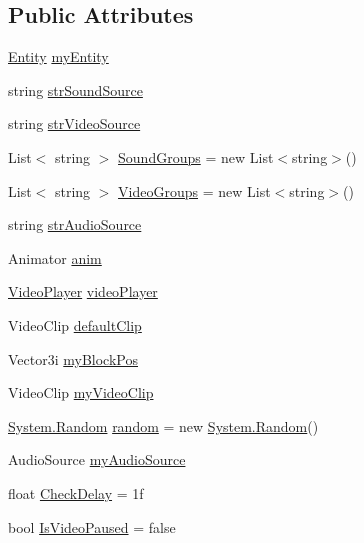 \subsection*{Public Attributes}
\begin{DoxyCompactItemize}
\item 
\mbox{\hyperlink{_the_01_restless_01_curse_2_config_2_localization_8txt_a831452d5736d8c492ddd792b09c12cde}{Entity}} \mbox{\hyperlink{class_music_box_script_a7ba5862fb7e7962d530b67a0ad8ec296}{my\+Entity}}
\item 
string \mbox{\hyperlink{class_music_box_script_a8c18df09c9b7073b85e945eef5819626}{str\+Sound\+Source}}
\item 
string \mbox{\hyperlink{class_music_box_script_ae437345fa8a68f90e00a958f5166ef7b}{str\+Video\+Source}}
\item 
List$<$ string $>$ \mbox{\hyperlink{class_music_box_script_ad24ee7923c7a633fc881d2f11e8f227d}{Sound\+Groups}} = new List$<$string$>$()
\item 
List$<$ string $>$ \mbox{\hyperlink{class_music_box_script_abe3dd8203dd5dc88f5abfac945c7853f}{Video\+Groups}} = new List$<$string$>$()
\item 
string \mbox{\hyperlink{class_music_box_script_a6afd9315a8e79ab480f26a101811ce29}{str\+Audio\+Source}}
\item 
Animator \mbox{\hyperlink{class_music_box_script_a466b8f3f5b4e00af10a0b5c0b3a346e7}{anim}}
\item 
\mbox{\hyperlink{_sphere_i_i_01_music_01_boxes_2_config_2_localization_8txt_a56e37348dc5b6d24d95c96cebefe15af}{Video\+Player}} \mbox{\hyperlink{class_music_box_script_a1b67f8837e4d93c47a7e07f1870b4a18}{video\+Player}}
\item 
Video\+Clip \mbox{\hyperlink{class_music_box_script_ad2c55059bedf46cb2c448f7cd6663e02}{default\+Clip}}
\item 
Vector3i \mbox{\hyperlink{class_music_box_script_aa76607105797e5a84ab1c108b1a42737}{my\+Block\+Pos}}
\item 
Video\+Clip \mbox{\hyperlink{class_music_box_script_a61172a8ddeb5c7751108c81f9af5cd7d}{my\+Video\+Clip}}
\item 
\mbox{\hyperlink{_winter_mod_prefab_8cs_a24953b19d956caa76c403684c71b4e5b}{System.\+Random}} \mbox{\hyperlink{class_music_box_script_ac1f77382b99a71d871c20be7987ca491}{random}} = new \mbox{\hyperlink{_winter_mod_prefab_8cs_a24953b19d956caa76c403684c71b4e5b}{System.\+Random}}()
\item 
Audio\+Source \mbox{\hyperlink{class_music_box_script_a9e706f2c37e334b8c2d25181520e5328}{my\+Audio\+Source}}
\item 
float \mbox{\hyperlink{class_music_box_script_a015f6762d90752421ef7372ee32979fc}{Check\+Delay}} = 1f
\item 
bool \mbox{\hyperlink{class_music_box_script_acb068b0301dace8a29c85fa28e6e7aee}{Is\+Video\+Paused}} = false
\end{DoxyCompactItemize}


